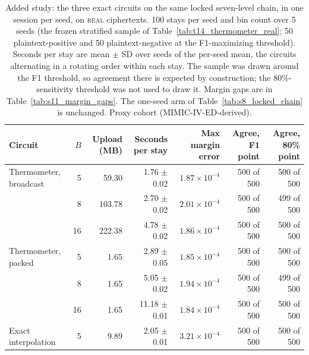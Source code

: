\begin{table}[t]
\centering
\caption{Added study: the three exact circuits on the same locked seven-level chain, in one session per seed, on \textsc{real} ciphertexts. 100 stays per seed and bin count over 5 seeds (the frozen stratified sample of Table~\ref{tab:t14_thermometer_real}; 50 plaintext-positive and 50 plaintext-negative at the F1-maximizing threshold). Seconds per stay are mean $\pm$ SD over seeds of the per-seed mean, the circuits alternating in a rotating order within each stay. The sample was drawn around the F1 threshold, so agreement there is expected by construction; the 80\%-sensitivity threshold was not used to draw it. Margin gaps are in Table~\ref{tab:s11_margin_gaps}. The one-seed arm of Table~\ref{tab:s8_locked_chain} is unchanged. Proxy cohort (MIMIC-IV-ED-derived).}
\label{tab:t17_samechain}
\begin{tabular}{lrrrrrr}
\toprule
Circuit & $B$ & Upload (MB) & Seconds per stay & Max margin error & Agree, F1 point & Agree, 80\% point \\
\midrule
Thermometer, broadcast & 5 & 59.30 & 1.76 $\pm$ 0.02 & $1.87 \times 10^{-4}$ & 500 of 500 & 500 of 500 \\
 & 8 & 103.78 & 2.70 $\pm$ 0.02 & $2.01 \times 10^{-4}$ & 500 of 500 & 499 of 500 \\
 & 16 & 222.38 & 4.78 $\pm$ 0.02 & $1.86 \times 10^{-4}$ & 500 of 500 & 500 of 500 \\
\midrule
Thermometer, packed & 5 & 1.65 & 2.89 $\pm$ 0.05 & $1.85 \times 10^{-4}$ & 500 of 500 & 500 of 500 \\
 & 8 & 1.65 & 5.05 $\pm$ 0.02 & $1.94 \times 10^{-4}$ & 500 of 500 & 499 of 500 \\
 & 16 & 1.65 & 11.18 $\pm$ 0.01 & $1.84 \times 10^{-4}$ & 500 of 500 & 500 of 500 \\
\midrule
Exact interpolation & 5 & 9.89 & 2.05 $\pm$ 0.01 & $3.21 \times 10^{-4}$ & 500 of 500 & 500 of 500 \\
\bottomrule
\end{tabular}
\end{table}
